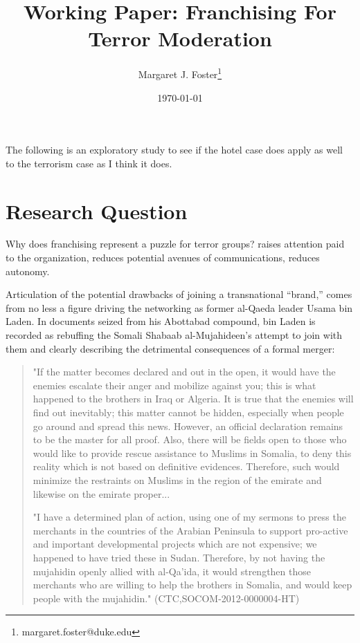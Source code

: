 \documentclass{article}
\author{Margaret J. Foster\thanks{margaret.foster@duke.edu}}
\title{Working Paper: Franchising For Terror Moderation}
\date{\today}
\begin{document}
\maketitle

The following is an exploratory study to see if the hotel case does
apply as well to the terrorism case as I think it does.



\section{Research Question}

Why does franchising represent a puzzle for terror groups?
raises attention paid to the organization, reduces potential avenues of
communications, reduces autonomy. 

Articulation of the potential drawbacks of joining a transnational
``brand,'' comes from no less a figure driving the networking as
former al-Qaeda leader Usama bin Laden.  In documents seized from his
Abottabad compound, bin Laden is recorded as rebuffing the Somali
Shabaab al-Mujahideen's attempt to join with them and clearly
describing the detrimental consequences of a formal merger:

\begin{quote}

"If the matter becomes declared and out in the open, it would have the
enemies escalate their anger and mobilize against you; this is what
happened to the brothers in Iraq or Algeria. It is true that the
enemies will find out inevitably; this matter cannot be hidden,
especially when people go around and spread this news. However, an
official declaration remains to be the master for all proof. Also,
there will be fields open to those who would like to provide rescue
assistance to Muslims in Somalia, to deny this reality which is not
based on definitive evidences. Therefore, such would minimize the
restraints on Muslims in the region of the emirate and likewise on the
emirate proper...

"I have a determined plan of action, using one of my sermons to press
the merchants in the countries of the Arabian Peninsula to support
pro-active and important developmental projects which are not
expensive; we happened to have tried these in Sudan. Therefore, by not
having the mujahidin openly allied with al-Qa'ida, it would strengthen
those merchants who are willing to help the brothers in Somalia, and
would keep people with the mujahidin." (CTC,SOCOM-2012-0000004-HT)
\end{quote}
\end{document}

